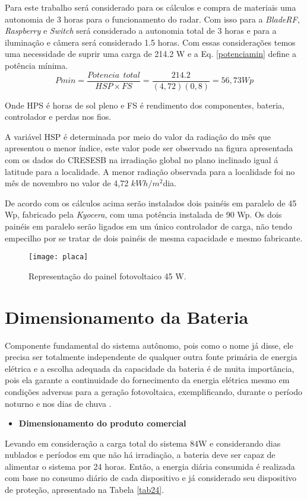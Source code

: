 Para este trabalho será considerado para os cálculos e compra de materiais uma autonomia de 3 horas para o funcionamento do radar. Com isso para a  \textit{BladeRF}, \textit{Raspberry} e \textit{Switch} será considerado a autonomia total de 3 horas e para a iluminação e câmera será considerado 1.5 horas. Com essas considerações temos uma necessidade de suprir uma carga de 214.2 W e a Eq. \ref{potenciamin} define a potência mínima.
\begin{equation}
    Pmin = \frac{Potencia\ \ total}{HSP \times FS} =\frac{214.2}{(4,72)(0,8)} = 56,73 Wp
    \label{potenciamin}
\end{equation}

Onde HPS é horas de sol pleno e FS é rendimento dos componentes, bateria, controlador e perdas nos fios.

A variável HSP é determinada por meio do valor da radiação do mês que apresentou o menor índice, este valor pode ser observado na figura apresentada com os dados do CRESESB \cite{solar} na irradiação global no plano inclinado igual á latitude para a localidade. A menor radiação observada para a localidade foi no mês de novembro no valor de 4,72 $kWh/m^2$dia. 
 
De acordo com os cálculos acima serão instalados dois painéis em paralelo de 45 Wp, fabricado pela \textit{Kyocera}, com uma potência instalada de 90 Wp. Os dois painéis em paralelo serão ligados em um único controlador de carga, não tendo empecilho  por se tratar de dois painéis de mesma capacidade e mesmo fabricante. 


\begin{figure}[H]
\centering
\texttt{[image: placa]}
\caption{Representação do painel fotovoltaico 45 W.}
\end{figure}

\section{Dimensionamento da Bateria}

Componente fundamental do sistema autônomo, pois como o nome já disse, ele precisa ser totalmente independente de qualquer outra fonte primária de energia elétrica e a escolha adequada da capacidade da bateria é de muita importância, pois ela garante a continuidade do fornecimento da energia elétrica mesmo em condições adversas para a geração fotovoltaica, exemplificando, durante o período noturno e nos dias de chuva \cite{alan}.
\begin{itemize}

 \item\textbf{Dimensionamento do produto comercial}
\end{itemize}
Levando em consideração a carga total do sistema 84W e considerando dias nublados e períodos em que não há irradiação, a bateria deve ser capaz de alimentar o sistema por 24 horas.
Então, a energia diária consumida é realizada com base no consumo diário de cada dispositivo e já considerado seu dispositivo de proteção, apresentado na Tabela \ref{tab24}.

